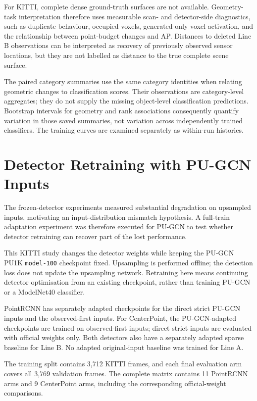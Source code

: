 For KITTI, complete dense ground-truth surfaces are not available. Geometry-task interpretation therefore uses measurable scan- and detector-side diagnostics, such as duplicate behaviour, occupied voxels, generated-only voxel activation, and the relationship between point-budget changes and AP. Distances to deleted Line B observations can be interpreted as recovery of previously observed sensor locations, but they are not labelled as distance to the true complete scene surface.

The paired category summaries use the same category identities when
relating geometric changes to classification scores. Their observations
are category-level aggregates; they do not supply the missing
object-level classification predictions. Bootstrap intervals for
geometry and rank associations consequently quantify variation in those
saved summaries, not variation across independently trained classifiers.
The training curves are examined separately as within-run histories.

\section{Detector Retraining with PU-GCN Inputs}
\label{sec:fc-4-11}

The frozen-detector experiments measured substantial degradation on upsampled inputs, motivating an input-distribution mismatch hypothesis. A full-train adaptation experiment was therefore executed for PU-GCN to test whether detector retraining can recover part of the lost performance.

This KITTI study changes the detector weights while keeping the PU-GCN
PU1K \texttt{model-100} checkpoint fixed. Upsampling is performed offline;
the detection loss does not update the upsampling network. Retraining
here means continuing detector optimisation from an existing checkpoint,
rather than training PU-GCN or a ModelNet40 classifier.

PointRCNN has separately adapted checkpoints for the direct strict
PU-GCN inputs and the observed-first inputs. For CenterPoint, the
PU-GCN-adapted checkpoints are trained on observed-first inputs; direct
strict inputs are evaluated with official weights only. Both detectors
also have a separately adapted sparse baseline for Line B. No adapted
original-input baseline was trained for Line A.

The training split contains 3,712 KITTI frames, and each final evaluation
arm covers all 3,769 validation frames. The complete matrix contains
11 PointRCNN arms and 9 CenterPoint arms, including the corresponding
official-weight comparisons.


